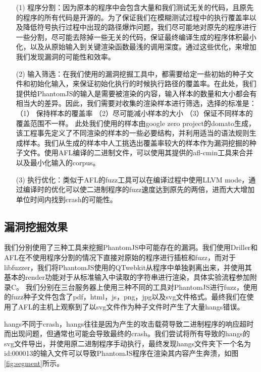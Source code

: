 \documentclass[doctor,privacy,twoside]{buaa_mac}
\begin{document}
\begin{itemize}
\item[(1)] 程序分割：因为原本的程序中会包含大量和我们测试无关的代码，且原先的程序的所有代码是开源的。为了保证我们在模糊测试过程中的执行覆盖率以及降低符号执行过程中出现的路径爆炸问题，我们尽可能地对原先的程序进行一些分割，尽可能去除掉一些无关的代码，保证最终编译生成的程序体积最小化，以及从原始输入到关键渲染函数最浅的调用深度。通过这些优化，来增加我们发现漏洞的可能性和效率。

\item[(2)] 输入筛选：在我们使用的漏洞挖掘工具中，都需要给定一些初始的种子文件和初始化输入，来保证初始化执行的时候执行路径的覆盖率。在此处，我们提供给PhantomJS的输入是需要被渲染的内容，输入样本的数量和大小都会有相当大的差异。因此，我们需要对收集的渲染样本进行筛选，选择的标准是：（1） 保持样本的覆盖率 （2）尽可能减小样本的大小 （3）保证不同样本的覆盖范围不一样。 此处我们使用的样本由google zero project的domato生成，该工程事先定义了不同渲染的样本的一些必要结构，并利用适当的语法规则生成样本。我们从生成的样本中人工挑选出覆盖率较大的样本作为漏洞挖掘的种子文件。使用AFL编译的二进制文件，可以使用其提供的afl-cmin工具来合并以及最小化输入的corpus。

\item[(3)] 执行优化：类似于AFL的fuzz工具可以在编译过程中使用LLVM mode，通过编译时的优化可以使二进制程序的fuzz速度达到原先的两倍，进而大大增加单位时间内找到crash的可能性。
\end{itemize}

\subsection{漏洞挖掘效果}
我们分别使用了三种工具来挖掘PhantomJS中可能存在的漏洞。我们使用Driller和AFL在不使用程序分割的情况下直接对原始的程序进行插桩和fuzz，而对于libfuzzer，我们将PhantomJS使用的QTwebkit从程序中单独剥离出来，并使用其基本的render功能对于从标准输入中读取的字符串进行渲染，具体实验流程参加附录C。 我们分别在三台服务器上使用三种不同的工具对PhantomJS进行fuzz，使用的fuzz种子文件包含了pdf，html，js，png，jpg以及svg文件格式。最终我们在使用了AFL的主机上观察到了以svg文件作为种子文件时产生了大量hangs错误。

hangs不同于crash，hangs往往是因为产生的攻击载荷导致二进制程序的响应超时而出现问题，但通常也可能会导致最终的crash。我们尝试将所有导致的hangs的svg文件导出，并使用原二进制程序手动执行，最终发现hangs文件夹下一个名为 id:000013的输入文件可以导致PhantomJS程序在渲染其内容产生奔溃，如图\ref{fig:segment}所示。
\end{document}
